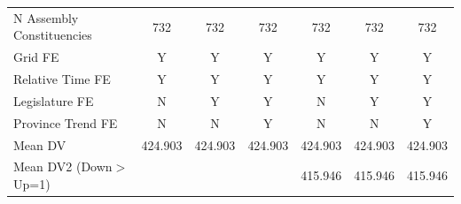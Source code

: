 {\begin{tabular}{l*{6}{c}}
N Assembly Constituencies&         732         &         732         &         732         &         732         &         732         &         732         \\
Grid FE     &           Y         &           Y         &           Y         &           Y         &           Y         &           Y         \\
Relative Time FE&           Y         &           Y         &           Y         &           Y         &           Y         &           Y         \\
Legislature FE&           N         &           Y         &           Y         &           N         &           Y         &           Y         \\
Province Trend FE&           N         &           N         &           Y         &           N         &           N         &           Y         \\
Mean DV     &     424.903         &     424.903         &     424.903         &     424.903         &     424.903         &     424.903         \\
Mean DV2 (Down$>$Up=1)&                     &                     &                     &     415.946         &     415.946         &     415.946         \\
\hline
\end{tabular}
}
